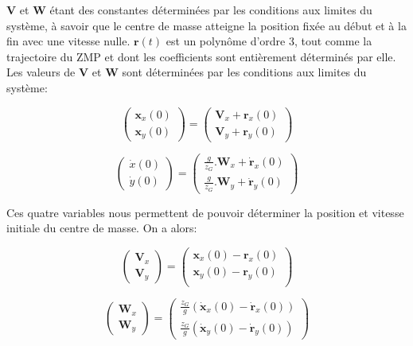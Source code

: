 $\mathbf{V}$ et $\mathbf{W}$ étant des constantes déterminées par les
conditions aux limites du système, à savoir que le centre de masse
atteigne la position fixée au début et à la fin avec une vitesse
nulle. $\textbf{r}(t)$ est un polynôme d'ordre 3, tout comme la
trajectoire du ZMP et dont les coefficients sont entièrement
déterminés par elle. Les valeurs de $\mathbf{V}$ et $\mathbf{W}$ sont
déterminées par les conditions aux limites du système:

\begin{equation}
  \left(
  \begin{array}{c}
    \mathbf{x}_x(0)\\
    \mathbf{x}_y(0)
  \end{array}
  \right) = \left(
  \begin{array}{c}
    \mathbf{V}_x + \mathbf{r}_x(0)\\
    \mathbf{V}_y + \mathbf{r}_y(0)
  \end{array}
  \right)
\end{equation}

\begin{equation}
  \left(
  \begin{array}{c}
    \dot{x}(0)\\
    \dot{y}(0)
  \end{array}
  \right) = \left(
  \begin{array}{c}
    \frac{g}{z_G} . \mathbf{W}_x + \dot{\mathbf{r}}_x(0)\\
    \frac{g}{z_G} . \mathbf{W}_y + \dot{\mathbf{r}}_y(0)
  \end{array}
  \right)
\end{equation}

Ces quatre variables nous permettent de pouvoir déterminer la position
et vitesse initiale du centre de masse. On a alors:

\begin{equation}
  \left(
  \begin{array}{c}
    \mathbf{V}_x\\
    \mathbf{V}_y
  \end{array}
  \right) = \left(
  \begin{array}{c}
    \mathbf{x}_x(0) - \mathbf{r}_x(0)\\
    \mathbf{x}_y(0) - \mathbf{r}_y(0)\\
  \end{array}
  \right)
\end{equation}

\begin{equation}
  \left(
  \begin{array}{c}
    \mathbf{W}_x\\
    \mathbf{W}_y
  \end{array}
  \right) = \left(
  \begin{array}{c}
    \frac{z_G}{g}(\dot{\mathbf{x}}_x(0) - \dot{\mathbf{r}}_x(0))\\
    \frac{z_G}{g}(\dot{\mathbf{x}}_y(0) - \dot{\mathbf{r}}_y(0))
  \end{array}
  \right)
\end{equation}

